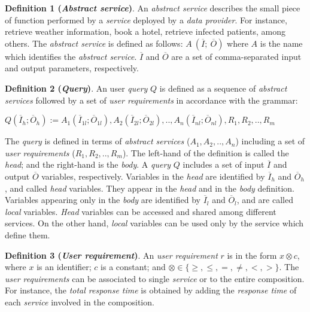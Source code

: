 
\noindent \textbf{Definition 1 (\textsl{Abstract service})}. An \textsl{abstract service} describes the small piece of function performed by a \textsl{service} deployed by a \textsl{data provider}. For instance, retrieve weather information, book a hotel, retrieve infected patients, among others. The \textsl{abstract service} is defined as follows: $A \ (\overline{I}; \ \overline{O})$ where $A$ is the name which identifies the \textsl{abstract service}. $\overline{I}$ and $\overline{O}$ are a set of comma-separated input and output parameters, respectively.

\bigskip
\noindent \textbf{Definition 2 (\textsl{Query})}.
An user \textsl{query} $Q$ is defined as a sequence of \textsl{abstract services} followed by a set of \textsl{user requirements} in accordance with the grammar:
%
\begin{center}
\begin{math}
Q (\overline{I}_{h}; \overline{O}_{h}) := A_{1}(\overline{I}_{1l};
\overline{O}_{1l}), A_{2}(\overline{I}_{2l}; \overline{O}_{2l}), ..,  A_{n}(\overline{I}_{nl}; \overline{O}_{nl}),R_{1},R_{2}, .., R_{m}
\end{math}
\end{center}
%
The \textsl{query} is defined in terms of \textsl{abstract services} ($A_{1}, A_{2}, .., A_{n}$) including a set of \textsl{user requirements} ($R_{1},R_{2}, .., R_{m}$). 
The left-hand of the definition is called the \textit{head}; and the right-hand is the \textit{body}. 
A \textsl{query} $Q$ includes a set of input $\overline{I}$ and output $\overline{O}$ variables, respectively.
Variables in the \textit{head} are identified by $\overline{I}_{h}$ and $\overline{O}_{h}$, and called \textit{head} variables. 
They appear in the \textit{head} and in the \textit{body} definition. 
Variables appearing only in the \textit{body} are identified by $\overline{I}_{l}$ and $\overline{O}_{l}$, and are called \textit{local} variables. \textit{Head} variables can be accessed and shared among different services. On the other hand, \textit{local} variables can be used only by the service which define them.
%

\bigskip
\noindent \textbf{Definition 3 (\textsl{User requirement})}.
An \textsl{user requirement} $r$ is in the form $x \otimes c$, where $x$ is an identifier; $c$ is a constant; and $\otimes \in\lbrace \geq, \leq, =, \neq, <, >\rbrace$. 
%
The \textsl{user requirements} can be associated to single \textsl{service} or to the entire composition. For instance, the \textsl{total response time} is obtained by adding the \textsl{response time} of each \textsl{service} involved in the composition.

